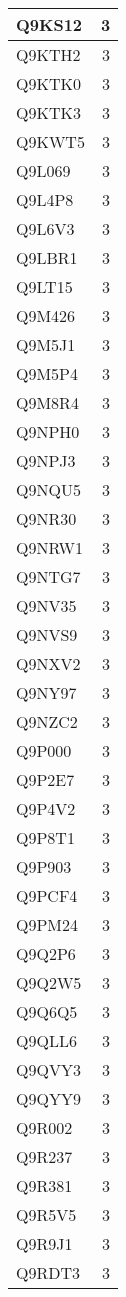 \documentclass[
]{book}
\theoremstyle{definition}
\theoremstyle{definition}
\theoremstyle{definition}
\theoremstyle{definition}
\theoremstyle{remark}
\begin{document}
\begin{table}
\begin{tabular}{l|r}
\hline
Q9KS12 & 3\\
\hline
Q9KTH2 & 3\\
\hline
Q9KTK0 & 3\\
\hline
Q9KTK3 & 3\\
\hline
Q9KWT5 & 3\\
\hline
Q9L069 & 3\\
\hline
Q9L4P8 & 3\\
\hline
Q9L6V3 & 3\\
\hline
Q9LBR1 & 3\\
\hline
Q9LT15 & 3\\
\hline
Q9M426 & 3\\
\hline
Q9M5J1 & 3\\
\hline
Q9M5P4 & 3\\
\hline
Q9M8R4 & 3\\
\hline
Q9NPH0 & 3\\
\hline
Q9NPJ3 & 3\\
\hline
Q9NQU5 & 3\\
\hline
Q9NR30 & 3\\
\hline
Q9NRW1 & 3\\
\hline
Q9NTG7 & 3\\
\hline
Q9NV35 & 3\\
\hline
Q9NVS9 & 3\\
\hline
Q9NXV2 & 3\\
\hline
Q9NY97 & 3\\
\hline
Q9NZC2 & 3\\
\hline
Q9P000 & 3\\
\hline
Q9P2E7 & 3\\
\hline
Q9P4V2 & 3\\
\hline
Q9P8T1 & 3\\
\hline
Q9P903 & 3\\
\hline
Q9PCF4 & 3\\
\hline
Q9PM24 & 3\\
\hline
Q9Q2P6 & 3\\
\hline
Q9Q2W5 & 3\\
\hline
Q9Q6Q5 & 3\\
\hline
Q9QLL6 & 3\\
\hline
Q9QVY3 & 3\\
\hline
Q9QYY9 & 3\\
\hline
Q9R002 & 3\\
\hline
Q9R237 & 3\\
\hline
Q9R381 & 3\\
\hline
Q9R5V5 & 3\\
\hline
Q9R9J1 & 3\\
\hline
Q9RDT3 & 3\\

\end{tabular}
\end{table}
\end{document}
